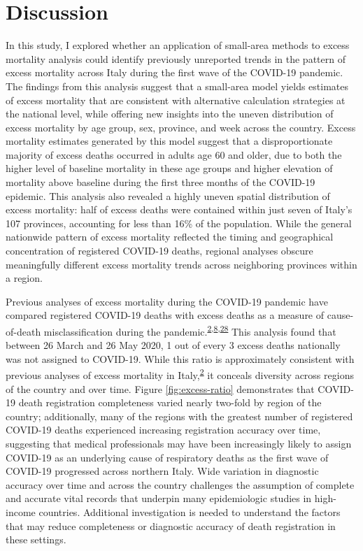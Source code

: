 \documentclass[
]{article}
\begin{document}
\hypertarget{discussion}{%
\section{Discussion}\label{discussion}}

In this study, I explored whether an application of small-area methods to excess mortality analysis could identify previously unreported trends in the pattern of excess mortality across Italy during the first wave of the COVID-19 pandemic. The findings from this analysis suggest that a small-area model yields estimates of excess mortality that are consistent with alternative calculation strategies at the national level, while offering new insights into the uneven distribution of excess mortality by age group, sex, province, and week across the country. Excess mortality estimates generated by this model suggest that a disproportionate majority of excess deaths occurred in adults age 60 and older, due to both the higher level of baseline mortality in these age groups and higher elevation of mortality above baseline during the first three months of the COVID-19 epidemic. This analysis also revealed a highly uneven spatial distribution of excess mortality: half of excess deaths were contained within just seven of Italy's 107 provinces, accounting for less than 16\% of the population. While the general nationwide pattern of excess mortality reflected the timing and geographical concentration of registered COVID-19 deaths, regional analyses obscure meaningfully different excess mortality trends across neighboring provinces within a region.

Previous analyses of excess mortality during the COVID-19 pandemic have compared registered COVID-19 deaths with excess deaths as a measure of cause-of-death misclassification during the pandemic.\textsuperscript{\protect\hyperlink{ref-Alicandro2020}{2},\protect\hyperlink{ref-Weinberger2020a}{8},\protect\hyperlink{ref-Woolf2020}{28}} This analysis found that between 26 March and 26 May 2020, 1 out of every 3 excess deaths nationally was not assigned to COVID-19. While this ratio is approximately consistent with previous analyses of excess mortality in Italy,\textsuperscript{\protect\hyperlink{ref-Alicandro2020}{2}} it conceals diversity across regions of the country and over time. Figure \ref{fig:excess-ratio} demonstrates that COVID-19 death registration completeness varied nearly two-fold by region of the country; additionally, many of the regions with the greatest number of registered COVID-19 deaths experienced increasing registration accuracy over time, suggesting that medical professionals may have been increasingly likely to assign COVID-19 as an underlying cause of respiratory deaths as the first wave of COVID-19 progressed across northern Italy. Wide variation in diagnostic accuracy over time and across the country challenges the assumption of complete and accurate vital records that underpin many epidemiologic studies in high-income countries. Additional investigation is needed to understand the factors that may reduce completeness or diagnostic accuracy of death registration in these settings.
\end{document}
